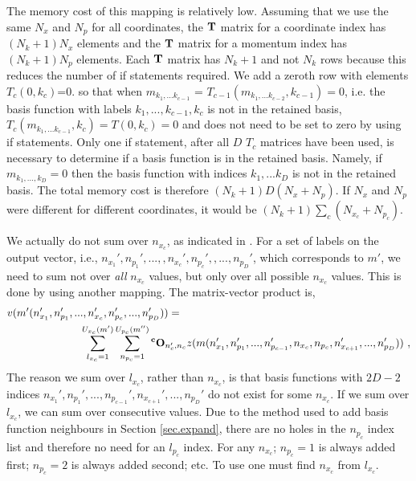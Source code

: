 % 
%
%
The memory cost of this mapping is relatively low.  Assuming that we use the same  
${N_x}$ and 
$ {N_p} $ for all coordinates,   the   ${\bf{T}}$  matrix     for a coordinate index  has 
$(N_k+1) N_x$ elements and the  ${\bf{T}}$  matrix     for a momentum index  has 
$(N_k+1) N_p$ elements.  
%
%
Each  ${\bf{T}}$  matrix  has      $N_k+1$ and not   $N_k$  rows  because this reduces the number of 
if statements required.   We add a zeroth row with elements    $T_c\left(0,k_c\right)$=0.    
so that  
%
when  $  m_{k_1,...k_{c-1}}$   = $    T_{c-1}\left(m_{k_1,...k_{c-2}},k_{c-1}\right)=0$, i.e.  the    basis function with labels $k_1,...,k_{c-1},k_c$ is not in the retained basis,
%
 $T_c\left(m_{k_1,...k_{c-1}},k_c\right)=T\left(0,k_c\right)=0$ and does not need to be set to zero by using if statements.   
%
 Only one if statement, after all $D$ $T_c$ matrices have been used, is necessary to determine if a basis function is in the retained basis. Namely, if $m_{k_1,...,k_D}=0$ then the basis function with indices $k_1,...k_D$ is not in the retained basis.  
%
%
 The total memory cost is therefore $(N_k+1)  D  (N_x+N_p)$.   If $N_x$ and $N_p$ were  different for different coordinates, it would be 
$  (N_k + 1) \sum_c  (N_{x_c}+N_{p_c})$.
% 
%










%
We actually do not sum over $n_{x_c}$,  as indicated in .   For a set of labels on the output vector, i.e.,   $
{n_{x_1}',n_{p_1}',...,,n_{x_c}',n_{p_c}', ,   ...,n_{p_{D}}'}$, which corresponds  to $m'$, we need to sum 
not over \emph{all}  $n_{x_c}$ values, but only over  all  possible $n_{x_c}$ values.  This is done by 
using another mapping.   The matrix-vector product is,
\begin{equation}
\begin{split}
v(m'(n_{x_1}',n_{p_1}',..&., n_{x_c}',n_{p_c}',...,n_{p_{D}}'))
= \\
 &\sum_{l_{x_c}=1}^{U_{x_c}({m'})}
  \sum_{n_{p_c}=1}^{U_{p_c}({m''})}
%
      \bs{ ^cO}_{n_c^{\prime},n_c}
z(m({n_{x_1}',n_{p_1}',...,n_{p_{c-1}}',n_{x_c},n_{p_c}, n_{x_{c+1}}',   ...,n_{p_{D}}'})) ~,
%
\end{split}
\label{with_nm}
\end{equation}
%
  The reason we sum over $l_{x_c}$, rather than 
 $n_{x_c}$,  is that 
basis functions with $2D-2$ indices 
$n_{x_1}',n_{p_1}',..., n_{p_{c-1}}',n_{x_{c+1}}',...,n_{p_{D}}'$
do not exist for    some   $n_{x_c}$.   If we sum over  $l_{x_c}$, we 
can sum over consecutive values.    
%
Due to the method used to add basis function neighbours in Section \ref{sec.expand}, there are no holes in the $n_{p_c}$ index list  
 and therefore no need for an $l_{p_c}$ index.  For any $n_{x_c}$; $n_{p_c}=1$ is always added first; $n_{p_c}=2$ is always added second; etc. 
%
To use  one must find $n_{x_c}$  from $l_{x_c}$.  
% 

